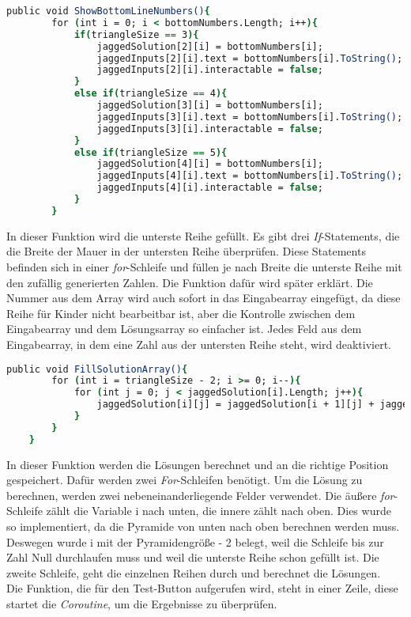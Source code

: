 \begin{lstlisting}[language=csh, caption={Triangle.cs ShowBottomLineNumbers-Funktion}]
	public void ShowBottomLineNumbers(){
		for (int i = 0; i < bottomNumbers.Length; i++){
			if(triangleSize == 3){
				jaggedSolution[2][i] = bottomNumbers[i];
				jaggedInputs[2][i].text = bottomNumbers[i].ToString();
				jaggedInputs[2][i].interactable = false;
			}
			else if(triangleSize == 4){
				jaggedSolution[3][i] = bottomNumbers[i];
				jaggedInputs[3][i].text = bottomNumbers[i].ToString();
				jaggedInputs[3][i].interactable = false;
			}
			else if(triangleSize == 5){
				jaggedSolution[4][i] = bottomNumbers[i];
				jaggedInputs[4][i].text = bottomNumbers[i].ToString();
				jaggedInputs[4][i].interactable = false;
			}
		}
\end{lstlisting}
In dieser Funktion wird die unterste Reihe gefüllt. Es gibt drei \textit{If}-Statements, die die Breite der Mauer in der untersten Reihe überprüfen. Diese Statements befinden sich in einer \textit{for}-Schleife und füllen je nach Breite die unterste Reihe mit den zufällig generierten Zahlen. Die Funktion dafür wird später erklärt. Die Nummer aus dem Array wird auch sofort in das Eingabearray eingefügt, da diese Reihe für Kinder nicht bearbeitbar ist, aber die Kontrolle zwischen dem Eingabearray und dem Lösungsarray so einfacher ist. Jedes Feld aus dem Eingabearray, in dem eine Zahl aus der untersten Reihe steht, wird deaktiviert.\\
\begin{lstlisting}[language=csh, caption={Triangle.cs FillSolutionArray-Funktion}]
	public void FillSolutionArray(){
		for (int i = triangleSize - 2; i >= 0; i--){
			for (int j = 0; j < jaggedSolution[i].Length; j++){
				jaggedSolution[i][j] = jaggedSolution[i + 1][j] + jaggedSolution[i + 1][j + 1];
			}
		}
	}
\end{lstlisting}
In dieser Funktion werden die Lösungen berechnet und an die richtige Position gespeichert. Dafür werden zwei \textit{For}-Schleifen benötigt. Um die Lösung zu berechnen, werden zwei nebeneinanderliegende Felder verwendet. Die äußere \textit{for}-Schleife zählt die Variable i nach unten, die innere zählt nach oben. Dies wurde so implementiert, da die Pyramide von unten nach oben berechnen werden muss. Deswegen wurde i mit der Pyramidengröße - 2 belegt, weil die Schleife bis zur Zahl Null durchlaufen muss und weil die unterste Reihe schon gefüllt ist. Die zweite Schleife, geht die einzelnen Reihen durch und berechnet die Lösungen.\\
Die Funktion, die für den Test-Button aufgerufen wird, steht in einer Zeile, diese startet die \textit{Coroutine}, um die Ergebnisse zu überprüfen.\\
